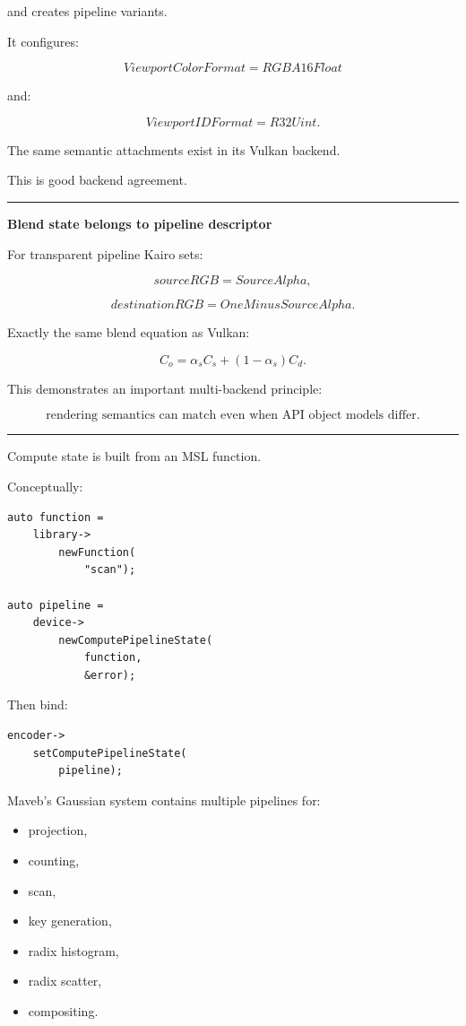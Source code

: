 and creates pipeline variants.

It configures:

\[
ViewportColorFormat=RGBA16Float
\]

and:

\[
ViewportIDFormat=R32Uint.
\]

The same semantic attachments exist in its Vulkan backend.

This is good backend agreement.

\begin{center}\rule{0.5\linewidth}{0.5pt}\end{center}

\textbf{Blend state belongs to pipeline descriptor}

For transparent pipeline Kairo sets:

\[
sourceRGB=
SourceAlpha,
\]

\[
destinationRGB=
OneMinusSourceAlpha.
\]

Exactly the same blend equation as Vulkan:

\[
C_o=
\alpha_s C_s
+
(1-\alpha_s)C_d.
\]

This demonstrates an important multi-backend principle:

\[
\boxed{
\text{rendering semantics can match even when API object models differ}.
}
\]

\begin{center}\rule{0.5\linewidth}{0.5pt}\end{center}

\textbf{}

Compute state is built from an MSL  function.

Conceptually:

\begin{verbatim}
auto function =
    library->
        newFunction(
            "scan");

auto pipeline =
    device->
        newComputePipelineState(
            function,
            &error);
\end{verbatim}

Then bind:

\begin{verbatim}
encoder->
    setComputePipelineState(
        pipeline);
\end{verbatim}

Maveb's Gaussian system contains multiple pipelines for:

\begin{itemize}
\tightlist
\item
  projection,
\item
  counting,
\item
  scan,
\item
  key generation,
\item
  radix histogram,
\item
  radix scatter,
\item
  compositing.
\end{itemize}

